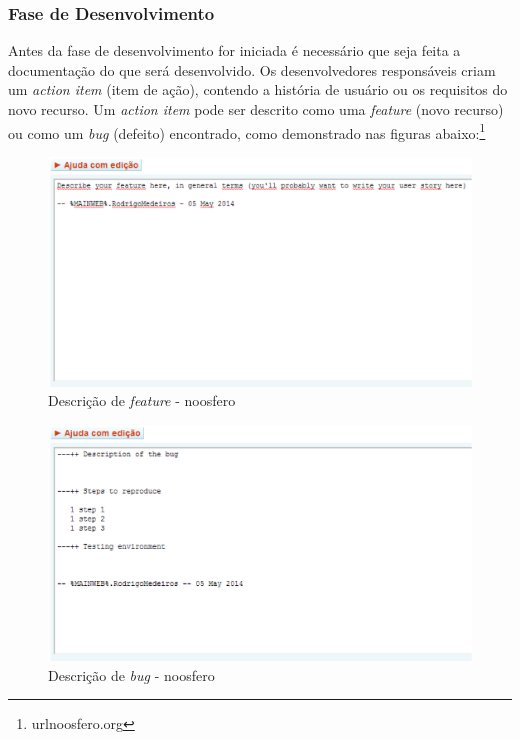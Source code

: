 \subsubsection{Fase de Desenvolvimento}
%
Antes da fase de desenvolvimento for iniciada é necessário que seja feita a 
documentação do que será desenvolvido. Os desenvolvedores responsáveis criam um 
\textit{action item} (item de ação), contendo a história de usuário ou os requisitos do novo 
recurso. Um \textit{action item} pode ser descrito como uma \textit{feature} (novo recurso) ou como 
um \textit{bug} (defeito) encontrado, como demonstrado nas figuras abaixo:\footnote{url{noosfero.org}}
%
\begin{figure}[!h]
    \centering
    \includegraphics[keepaspectratio=true,scale=0.65]
      {figuras/noosfero_feature.eps}
    \caption{Descrição de \textit{feature} - noosfero}
    \label{noosfero_feature}
\end{figure}
%
\begin{figure}[!h]
    \centering
    \includegraphics[keepaspectratio=true,scale=0.65]
      {figuras/noosfero_bug.eps}
    \caption{Descrição de \textit{bug} - noosfero}
    \label{noosfero_bug}
\end{figure}

